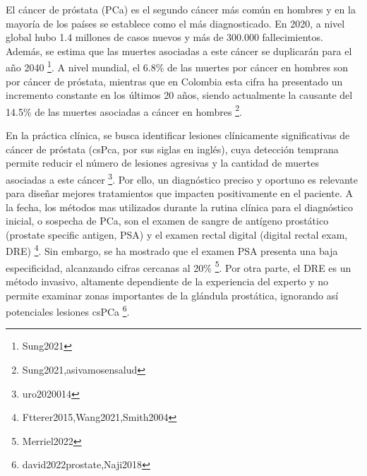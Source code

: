 




El cáncer de próstata (PCa) es el segundo cáncer más común en hombres y en la mayoría de los países se establece como el más diagnosticado. En 2020, a nivel global hubo 1.4 millones de casos nuevos y más de 300.000 fallecimientos. Además, se estima que las muertes asociadas a este cáncer se duplicarán para el año 2040 \footnote{Sung2021}. A nivel mundial, el 6.8\% de las muertes por cáncer en hombres son por cáncer de próstata, mientras que en Colombia esta cifra ha presentado un incremento constante en los últimos 20 años, siendo actualmente la causante del 14.5\% de las muertes asociadas a cáncer en hombres  \footnote{Sung2021,asivamosensalud}.\par

En la práctica clínica, se busca identificar lesiones clínicamente significativas de cáncer de próstata (csPca, por sus siglas en inglés), cuya detección temprana permite reducir el número de lesiones agresivas y la cantidad de muertes asociadas a este cáncer \footnote{uro2020014}. Por ello, un diagnóstico preciso y oportuno es relevante para diseñar mejores tratamientos que impacten positivamente en el paciente. A la fecha, los métodos mas utilizados durante la rutina clínica para el diagnóstico inicial, o sospecha de PCa, son el examen de sangre de antígeno prostático (prostate specific antigen, PSA) y el examen rectal digital (digital rectal exam, DRE) \footnote{Ftterer2015,Wang2021,Smith2004}. Sin embargo, se ha mostrado que el examen PSA presenta una baja especificidad, alcanzando cifras cercanas al 20\% \footnote{Merriel2022}. Por otra parte, el DRE es un método invasivo, altamente dependiente de la experiencia del experto y no permite examinar zonas importantes de la glándula prostática, ignorando así potenciales lesiones csPCa \footnote{david2022prostate,Naji2018}.\par



